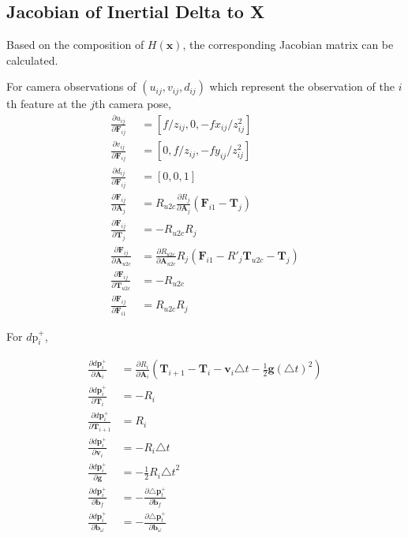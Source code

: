 \documentclass[12pt]{article}   %
\begin{document}
\subsection{Jacobian of Inertial Delta to X}
Based on the composition of $H(\textbf{x})$, the corresponding Jacobian matrix can be calculated. 

For camera observations of $(u_{ij}, v_{ij}, d_{ij})$ which represent the observation of the $i$th feature at the $j$th camera pose, 
\begin{align}
\frac{\partial u_{ij}}{\partial \textbf{F}_{ij}} &= [f/z_{ij}, 0, -fx_{ij}/z^2_{ij}] \\
\frac{\partial v_{ij}}{\partial \textbf{F}_{ij}} &= [0, f/z_{ij}, -fy_{ij}/z^2_{ij}] \\
\frac{\partial d_{ij}}{\partial \textbf{F}_{ij}} &= [0, 0, 1] \\
\frac{\partial \textbf{F}_{ij}}{\partial \textbf{A}_{j}} &= R_{u2c} \frac{\partial R_{j}}{\partial \textbf{A}_{j}} (\textbf{F}_{i1} - \textbf{T}_{j}) \\
\frac{\partial \textbf{F}_{ij}}{\partial \textbf{T}_{j}} &= -R_{u2c} R_{j} \\
\frac{\partial \textbf{F}_{ij}}{\partial \textbf{A}_{u2c}} &= \frac{\partial R_{u2c}}{\partial \textbf{A}_{u2c}} R_{j}(\textbf{F}_{i1} - R'_{j} \textbf{T}_{u2c} - \textbf{T}_{j}) \\
\frac{\partial \textbf{F}_{ij}}{\partial \textbf{T}_{u2c}} &= -R_{u2c}\\
\frac{\partial \textbf{F}_{ij}}{\partial \textbf{F}_{i1}} &= R_{u2c} R_{j} 
\end{align}

For $d\text{p}^+_{i}$,

\begin{align}
\frac{\partial d\textbf{p}^+_{i}}{\partial \textbf{A}_{i}} &= \frac{\partial R_i}{\partial \textbf{A}_i} (\textbf{T}_{i+1} - \textbf{T}_i - \textbf{v}_i \triangle t - \frac{1}{2} \textbf{g} {(\triangle t)}^2) \\
\frac{\partial d\textbf{p}^+_{i}}{\partial \textbf{T}_{i}} &= -R_i \\
\frac{\partial d\textbf{p}^+_{i}}{\partial \textbf{T}_{i+1}} &= R_i \\
\frac{\partial d\textbf{p}^+_{i}}{\partial \textbf{v}_{i}} &= -R_i \triangle t \\
\frac{\partial d\textbf{p}^+_{i}}{\partial \textbf{g}} &= -\frac{1}{2} R_i {\triangle t}^2 \\
\frac{\partial d\textbf{p}^+_{i}}{\partial \textbf{b}_f} &= - \frac{\partial \triangle \textbf{p}^+_t}{\partial \textbf{b}_f}\\
\frac{\partial d\textbf{p}^+_{i}}{\partial \textbf{b}_\omega} &= - \frac{\partial \triangle \textbf{p}^+_t}{\partial \textbf{b}_\omega}
\end{align}
\end{document}

